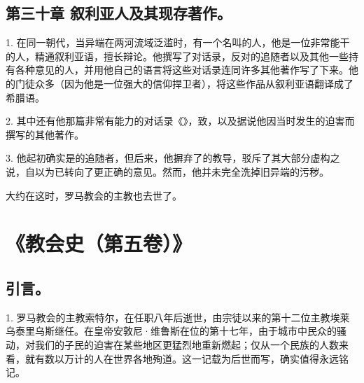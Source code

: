 
\subsection{第三十章 叙利亚人及其现存著作。}

1. 在同一朝代，当异端在两河流域泛滥时，有一个名叫的人，他是一位非常能干的人，精通叙利亚语，擅长辩论。他撰写了对话录，反对的追随者以及其他一些持有各种意见的人，并用他自己的语言将这些对话录连同许多其他著作写了下来。他的门徒众多（因为他是一位强大的信仰捍卫者），将这些作品从叙利亚语翻译成了希腊语。\par

2. 其中还有他那篇非常有能力的对话录《》，致，以及据说他因当时发生的迫害而撰写的其他著作。\par

3. 他起初确实是的追随者，但后来，他摒弃了的教导，驳斥了其大部分虚构之说，自以为已转向了更正确的意见。然而，他并未完全洗掉旧异端的污秽。\par

大约在这时，罗马教会的主教也去世了。\par



\section{《教会史（第五卷）》}


\subsection{引言。}

1. 罗马教会的主教索特尔，在任职八年后逝世，由宗徒以来的第十二位主教埃莱乌泰里乌斯继任。在皇帝安敦尼·维鲁斯在位的第十七年，由于城市中民众的骚动，对我们的子民的迫害在某些地区更猛烈地重新燃起；仅从一个民族的人数来看，就有数以万计的人在世界各地殉道。这一记载为后世而写，确实值得永远铭记。\par

